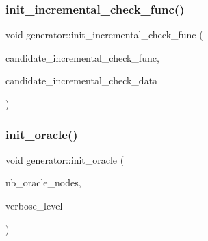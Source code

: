 \mbox{\label{classgenerator_a2884579b5db297fec3f34bec9911bd70}} 
\subsubsection{\texorpdfstring{init\+\_\+incremental\+\_\+check\+\_\+func()}{init\_incremental\_check\_func()}}
{\footnotesize\ttfamily void generator\+::init\+\_\+incremental\+\_\+check\+\_\+func (\begin{DoxyParamCaption}\item[{\mbox{\hyperlink{galois_8h_a09fddde158a3a20bd2dcadb609de11dc}{I\+NT}}($\ast$)(\mbox{\hyperlink{galois_8h_a09fddde158a3a20bd2dcadb609de11dc}{I\+NT}} len, \mbox{\hyperlink{galois_8h_a09fddde158a3a20bd2dcadb609de11dc}{I\+NT}} $\ast$\mbox{\hyperlink{classgenerator_a5d2b65e2bd0e451744af1a47ba00bd96}{S}}, void $\ast$data, \mbox{\hyperlink{galois_8h_a09fddde158a3a20bd2dcadb609de11dc}{I\+NT}} \mbox{\hyperlink{classgenerator_a7fedc6488314cbc00dbfcc42d311e1ce}{verbose\+\_\+level}})}]{candidate\+\_\+incremental\+\_\+check\+\_\+func,  }\item[{void $\ast$}]{candidate\+\_\+incremental\+\_\+check\+\_\+data }\end{DoxyParamCaption})}

\mbox{\label{classgenerator_aab9339b27020b22ae9655d4413a88e40}} 
\subsubsection{\texorpdfstring{init\+\_\+oracle()}{init\_oracle()}}
{\footnotesize\ttfamily void generator\+::init\+\_\+oracle (\begin{DoxyParamCaption}\item[{\mbox{\hyperlink{galois_8h_a09fddde158a3a20bd2dcadb609de11dc}{I\+NT}}}]{nb\+\_\+oracle\+\_\+nodes,  }\item[{\mbox{\hyperlink{galois_8h_a09fddde158a3a20bd2dcadb609de11dc}{I\+NT}}}]{verbose\+\_\+level }\end{DoxyParamCaption})}

\mbox{\label{classgenerator_af772cc76eb68482a86e61fbd51672513}} 
